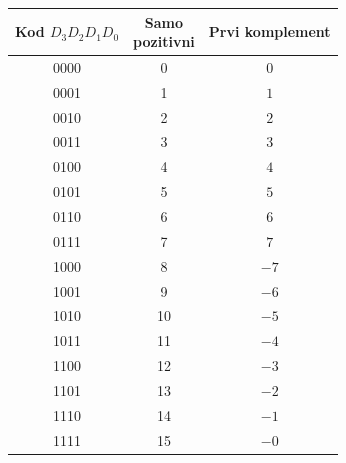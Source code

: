 \begin{tabular}{ccc}\toprule
\makecell{Kod\\$D_3 D_2 D_1 D_0$}&\makecell{Samo\\pozitivni}&Prvi komplement\\\midrule
0000&0&$0$\\
0001&1&$1$\\
0010&2&$2$\\
0011&3&$3$\\
0100&4&$4$\\
0101&5&$5$\\
0110&6&$6$\\
0111&7&$7$\\
\midrule
1000&8&$-7$\\
1001&9&$-6$\\
1010&10&$-5$\\
1011&11&$-4$\\
1100&12&$-3$\\
1101&13&$-2$\\
1110&14&$-1$\\
1111&15&$-0$\\
\bottomrule\end{tabular}
